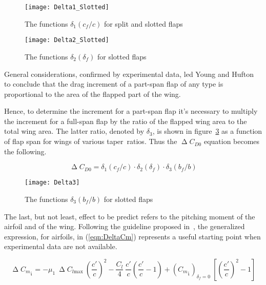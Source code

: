 \begin{figure}[H]
  \centering
  \texttt{[image: Delta1\_Slotted]}
  \caption{The functions $\delta_1\left(c_f/c\right)$ for split and slotted flaps}
  \label{fig:Delta2Plain}
\end{figure}

\begin{figure}[H]
  \centering
  \texttt{[image: Delta2\_Slotted]}
  \caption{The functions $\delta_2\left(\delta_f\right)$ for slotted flaps}
  \label{fig:Delta2Slotted}
\end{figure}

\bigskip
\noindent
General considerations, confirmed by experimental data, led Young and Hufton to conclude that the drag increment of a part-span flap of any type is proportional to the area of the flapped part of the wing.

\noindent
Hence, to determine the increment for a part-span flap it's necessary to multiply the increment for a full-span flap by the ratio of the flapped wing area to the total wing area. The latter ratio, denoted by $\delta_3$, is shown in figure~\ref{fig:Delta3} as a function of flap span for wings of various taper~ratios. Thus the $\upDelta C_{D0}$ equation becomes the following.

\begin{equation}
\upDelta C_{D0}=\delta_1\left(c_f/c\right)\cdot\delta_2\left(\delta_f\right)\cdot\delta_3\left(b_f/b\right)
\label{eqn:DeltaCD0PartSpan}
\end{equation}

\begin{figure}[!b]
  \centering
  \texttt{[image: Delta3]}
  \caption{The functions $\delta_3\left(b_f/b\right)$ for slotted flaps}
  \label{fig:Delta3}
\end{figure}

\bigskip
\noindent
The last, but not least, effect to be predict refers to the pitching moment of the airfoil and of the wing. Following the guideline proposed in~\cite{torenbeek1982synthesis}, the generalized expression, for airfoils, in (\ref{eqn:DeltaCm}) represents a useful starting point when experimental data are not available.

\begin{equation}
\upDelta C_{m_{\frac{c}{4}}}=-\mu_1\ \upDelta C_{l\text{max}}\ \left(\dfrac{c'}{c}\right)^2-\dfrac{C_l}{4}\ \dfrac{c'}{c}\left(\dfrac{c'}{c}-1\right)+\left(C_{m_{\frac{c}{4}}}\right)_{\delta_f=0}\ \left[\left(\dfrac{c'}{c}\right)^2-1\right]
\label{eqn:DeltaCm}
\end{equation}

